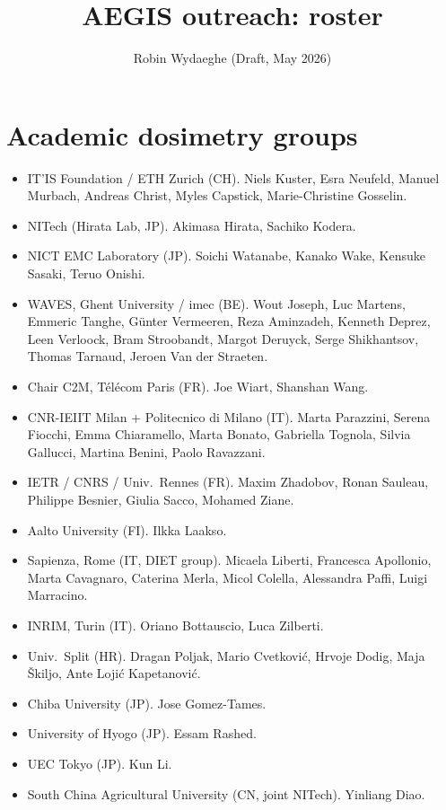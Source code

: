 \documentclass[10pt,a4paper]{article}
\title{\vspace{-1.5em}AEGIS outreach: roster}
\author{Robin Wydaeghe \quad (Draft, May 2026)}
\date{}
\begin{document}
\maketitle
\vspace{-2em}

\section{Academic dosimetry groups}
\begin{itemize}
  \item IT'IS Foundation / ETH Zurich (CH). Niels Kuster, Esra Neufeld, Manuel Murbach, Andreas Christ, Myles Capstick, Marie-Christine Gosselin.
  \item NITech (Hirata Lab, JP). Akimasa Hirata, Sachiko Kodera.
  \item NICT EMC Laboratory (JP). Soichi Watanabe, Kanako Wake, Kensuke Sasaki, Teruo Onishi.
  \item WAVES, Ghent University / imec (BE). Wout Joseph, Luc Martens, Emmeric Tanghe, G\"unter Vermeeren, Reza Aminzadeh, Kenneth Deprez, Leen Verloock, Bram Stroobandt, Margot Deruyck, Serge Shikhantsov, Thomas Tarnaud, Jeroen Van der Straeten.
  \item Chair C2M, T\'el\'ecom Paris (FR). Joe Wiart, Shanshan Wang.
  \item CNR-IEIIT Milan + Politecnico di Milano (IT). Marta Parazzini, Serena Fiocchi, Emma Chiaramello, Marta Bonato, Gabriella Tognola, Silvia Gallucci, Martina Benini, Paolo Ravazzani.
  \item IETR / CNRS / Univ.\ Rennes (FR). Maxim Zhadobov, Ronan Sauleau, Philippe Besnier, Giulia Sacco, Mohamed Ziane.
  \item Aalto University (FI). Ilkka Laakso.
  \item Sapienza, Rome (IT, DIET group). Micaela Liberti, Francesca Apollonio, Marta Cavagnaro, Caterina Merla, Micol Colella, Alessandra Paffi, Luigi Marracino.
  \item INRIM, Turin (IT). Oriano Bottauscio, Luca Zilberti.
  \item Univ.\ Split (HR). Dragan Poljak, Mario Cvetkovi\'c, Hrvoje Dodig, Maja \v{S}kiljo, Ante Loji\'c Kapetanovi\'c.
  \item Chiba University (JP). Jose Gomez-Tames.
  \item University of Hyogo (JP). Essam Rashed.
  \item UEC Tokyo (JP). Kun Li.
  \item South China Agricultural University (CN, joint NITech). Yinliang Diao.

\end{itemize}
\end{document}
